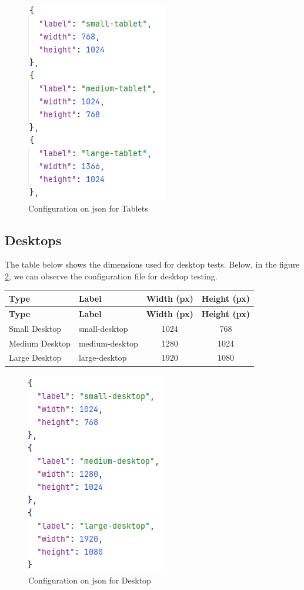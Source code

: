 \documentclass[a4paper,11pt,openright,BCOR=15mm]{scrbook}
\begin{document}
\begin{figure}[H]
	\centering
	\includegraphics[width=.3\textwidth]{figs/Visual compatibility/Tablet.png}
	\caption{Configuration on json for Tablets}
	\label{fig:Tablets}
\end{figure}

\subsection{Desktops}
The table below shows the dimensions used for desktop tests. Below, in the figure \ref{fig:Desktop}, we can observe the configuration file for desktop testing.


\begin{longtable}{|l|l|c|c|}
\hline
\textbf{Type} & \textbf{Label} & \textbf{Width (px)} & \textbf{Height (px)} \\
\hline
\endfirsthead
\hline
\textbf{Type} & \textbf{Label} & \textbf{Width (px)} & \textbf{Height (px)} \\
\hline
\endhead
Small Desktop & small-desktop & 1024 & 768 \\
Medium Desktop & medium-desktop & 1280 & 1024 \\
Large Desktop & large-desktop & 1920 & 1080 \\
\hline
\end{longtable}

\begin{figure}[H]
	\centering
	\includegraphics[width=.3\textwidth]{figs/Visual compatibility/Desktop.png}
	\caption{Configuration on json for Desktop}
	\label{fig:Desktop}
\end{figure}
\end{document}
